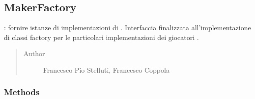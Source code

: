 \documentclass[letterpaper,10pt,italian,openany,oneside]{sphinxmanual}
\begin{document}
\begin{fulllineitems}
\label{\detokenize{source/it/unicam/cs/pa/mastermind/factories/InteractiveMakerFactory:it.unicam.cs.pa.mastermind.factories.InteractiveMakerFactory.getName()}}
\end{fulllineitems}



\subsection{MakerFactory}
\label{\detokenize{source/it/unicam/cs/pa/mastermind/factories/MakerFactory:makerfactory}}\label{\detokenize{source/it/unicam/cs/pa/mastermind/factories/MakerFactory::doc}}

\begin{fulllineitems}
\label{\detokenize{source/it/unicam/cs/pa/mastermind/factories/MakerFactory:it.unicam.cs.pa.mastermind.factories.MakerFactory}}
: fornire istanze di implementazioni di . Interfaccia finalizzata all’implementazione di classi factory per le particolari implementazioni dei giocatori .
\begin{quote}\begin{description}
\item[{Author}] \leavevmode
Francesco Pio Stelluti, Francesco Coppola

\end{description}\end{quote}

\end{fulllineitems}



\subsubsection{Methods}
\label{\detokenize{source/it/unicam/cs/pa/mastermind/factories/MakerFactory:methods}}
\end{document}
